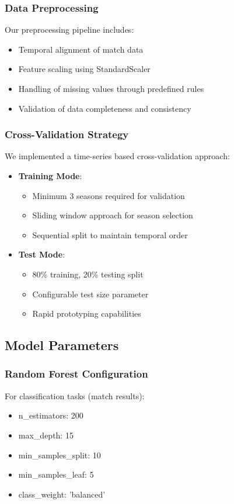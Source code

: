 \documentclass[conference]{IEEEtran}
\begin{document}
\subsubsection{Data Preprocessing}
Our preprocessing pipeline includes:
\begin{itemize}
\item Temporal alignment of match data
\item Feature scaling using StandardScaler
\item Handling of missing values through predefined rules
\item Validation of data completeness and consistency
\end{itemize}

\subsubsection{Cross-Validation Strategy}
We implemented a time-series based cross-validation approach:
\begin{itemize}
\item \textbf{Training Mode}:
    \begin{itemize}
    \item Minimum 3 seasons required for validation
    \item Sliding window approach for season selection
    \item Sequential split to maintain temporal order
    \end{itemize}
\item \textbf{Test Mode}:
    \begin{itemize}
    \item 80\% training, 20\% testing split
    \item Configurable test size parameter
    \item Rapid prototyping capabilities
    \end{itemize}
\end{itemize}

\subsection{Model Parameters}
\subsubsection{Random Forest Configuration}
For classification tasks (match results):
\begin{itemize}
\item n\_estimators: 200
\item max\_depth: 15
\item min\_samples\_split: 10
\item min\_samples\_leaf: 5
\item class\_weight: 'balanced'
\end{itemize}
\end{document}
